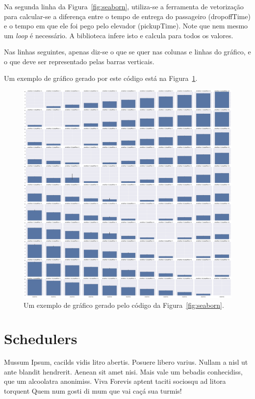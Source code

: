 Na segunda linha da Figura~\ref{fig:seaborn}, utiliza-se a ferramenta de
vetorização para calcular-se a diferença entre o tempo de entrega do passageiro
(\textsf{dropoffTime}) e o tempo em que ele foi pego pelo elevador
(\textsf{pickupTime}). Note que nem mesmo um \textit{loop} é necessário. A
biblioteca infere isto e calcula para todos os valores.

Nas linhas seguintes, apenas diz-se o que se quer nas colunas e linhas do
gráfico, e o que deve ser representado pelas barras verticais.

Um exemplo de gráfico gerado por este código está na Figura~\ref{fig:seaborn:exemplo}.

\begin{figure}[htb]
  \centering
  \includegraphics[scale=0.1]{img/seaborn_example.eps}
  \caption{Um exemplo de gráfico gerado pelo código da
    Figura~\ref{fig:seaborn}.}
  \label{fig:seaborn:exemplo}
\end{figure}

\section{Schedulers}

Mussum Ipsum, cacilds vidis litro abertis. Posuere libero varius. Nullam a nisl
ut ante blandit hendrerit. Aenean sit amet nisi. Mais vale um bebadis
conhecidiss, que um alcoolatra anonimiss. Viva Forevis aptent taciti sociosqu ad
litora torquent Quem num gosti di mum que vai caçá sua turmis!

